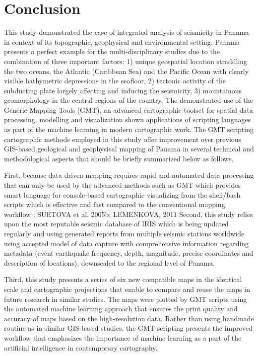 \documentclass[10pt,twoside,twocolumn,a4paper]{article}
\begin{document}
\section{Conclusion}
This study demonstrated the case of integrated analysis of seismicity in Panama in context of its topographic, geophysical and environmental setting. Panama presents a perfect example for the multi-disciplinary studies due to the combination of three important factors: 1) unique geospatial location straddling the two oceans, the Atlantic (Caribbean Sea) and the Pacific Ocean with clearly visible bathymetric depressions in the seafloor, 2) tectonic activity of the subducting plate largely affecting and inducing the seismicity, 3) mountainous geomorphology in the central regions of the country.
The demonstrated use of the Generic Mapping Tools (GMT), an advanced cartographic toolset for spatial data processing, modelling and visualization shown applications of scripting languages as part of the machine learning in modern cartographic work. The GMT scripting cartographic methods employed in this study offer improvement over previous GIS-based geological and geophysical mapping of Panama in several technical and methodological aspects that should be briefly summarized below as follows.  

First, because data-driven mapping requires rapid and automated data processing that can only be used by the advanced methods such as GMT which provides smart language for console-based cartographic visualizing from the shell/bash scripts which is effective and fast compared to the conventional mapping workflow \cite{Ambraseys,Gonzalez,Wabnitz,Lemenkova2012j}; SUETOVA et al. 2005b; LEMENKOVA, 2011
Second, this study relies upon the most reputable seismic database of IRIS which is being updated regularly and using generated reports from multiple seismic stations worldwide using accepted model of data capture with comprehensive information regarding metadata (event earthquake frequency, depth, magnitude, precise coordinates and description of locations), downscaled to the regional level of Panama. 

Third, this study presents a series of six new compatible maps in the identical scale and cartographic projections that enable to compare and reuse the maps in future research in similar studies. The maps were plotted by GMT scripts using the automated machine learning approach that ensures the print quality and accuracy of maps based on the high-resolution data. Rather than using handmade routine as in similar GIS-based studies, the GMT scripting presents the improved workflow that emphasizes the importance of machine learning as a part of the artificial intelligence in contemporary cartography.
\end{document}
